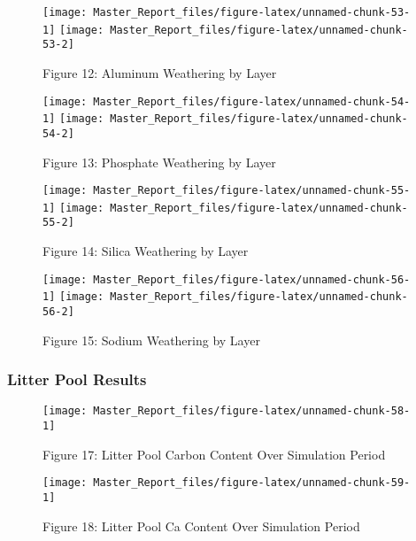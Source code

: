 \documentclass[
]{article}
\begin{document}
\begin{figure}[H]
\texttt{[image: Master\_Report\_files/figure-latex/unnamed-chunk-53-1]} \texttt{[image: Master\_Report\_files/figure-latex/unnamed-chunk-53-2]} \caption{Figure 12: Aluminum Weathering by Layer}\label{fig:unnamed-chunk-53}
\end{figure}

\begin{figure}[H]
\texttt{[image: Master\_Report\_files/figure-latex/unnamed-chunk-54-1]} \texttt{[image: Master\_Report\_files/figure-latex/unnamed-chunk-54-2]} \caption{Figure 13: Phosphate Weathering by Layer}\label{fig:unnamed-chunk-54}
\end{figure}

\begin{figure}[H]
\texttt{[image: Master\_Report\_files/figure-latex/unnamed-chunk-55-1]} \texttt{[image: Master\_Report\_files/figure-latex/unnamed-chunk-55-2]} \caption{Figure 14: Silica Weathering by Layer}\label{fig:unnamed-chunk-55}
\end{figure}

\begin{figure}[H]
\texttt{[image: Master\_Report\_files/figure-latex/unnamed-chunk-56-1]} \texttt{[image: Master\_Report\_files/figure-latex/unnamed-chunk-56-2]} \caption{Figure 15: Sodium Weathering by Layer}\label{fig:unnamed-chunk-56}
\end{figure}

\hypertarget{litter-pool-results-1}{%
\subsubsection{Litter Pool Results}\label{litter-pool-results-1}}

\begin{figure}[H]
\texttt{[image: Master\_Report\_files/figure-latex/unnamed-chunk-58-1]} \caption{Figure 17: Litter Pool Carbon Content Over Simulation Period}\label{fig:unnamed-chunk-58}
\end{figure}

\begin{figure}[H]
\texttt{[image: Master\_Report\_files/figure-latex/unnamed-chunk-59-1]} \caption{Figure 18: Litter Pool Ca Content Over Simulation Period}\label{fig:unnamed-chunk-59}
\end{figure}
\end{document}
